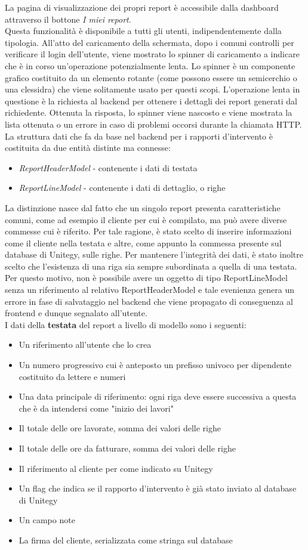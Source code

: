 La pagina di visualizzazione dei propri report è accessibile dalla dashboard attraverso il bottone \emph{I miei report}.
\\
Questa funzionalità è disponibile a tutti gli utenti, indipendentemente dalla tipologia.
All'atto del caricamento della schermata, dopo i comuni controlli per verificare il login dell'utente, viene mostrato lo spinner di caricamento a indicare che è in corso 
un'operazione potenzialmente lenta.
Lo spinner è un componente grafico costituito da un elemento rotante (come possono essere un semicerchio o una clessidra) che viene solitamente usato per questi scopi.
L'operazione lenta in questione è la richiesta al backend per ottenere i dettagli dei report generati dal richiedente.
Ottenuta la risposta, lo spinner viene nascosto e viene mostrata la lista ottenuta o un errore in caso di problemi occorsi durante la chiamata HTTP.
La struttura dati che fa da base nel backend per i rapporti d'intervento è costituita da due entità distinte ma connesse:
\begin{itemize}
    \item \emph{ReportHeaderModel} - contenente i dati di testata
    \item \emph{ReportLineModel} - contenente i dati di dettaglio, o righe
\end{itemize}
La distinzione nasce dal fatto che un singolo report presenta caratteristiche comuni, come ad esempio il cliente per cui è compilato, ma può avere diverse commesse cui è riferito.
Per tale ragione, è stato scelto di inserire informazioni come il cliente nella testata e altre, come appunto la commessa presente sul database di Unitegy, sulle righe.
Per mantenere l'integrità dei dati, è stato inoltre scelto che l'esistenza di una riga sia sempre subordinata a quella di una testata.
Per questo motivo, non è possibile avere un oggetto di tipo ReportLineModel senza un riferimento al relativo ReportHeaderModel e tale evenienza genera un errore in fase di salvataggio
nel backend che viene propagato di conseguenza al frontend e dunque segnalato all'utente.
\\
I dati della \textbf{testata} del report a livello di modello sono i seguenti:
\begin{itemize}
    \item Un riferimento all'utente che lo crea
    \item Un numero progressivo cui è anteposto un prefisso univoco per dipendente costituito da lettere e numeri
    \item Una data principale di riferimento: ogni riga deve essere successiva a questa che è da intendersi come "inizio dei lavori"
    \item Il totale delle ore lavorate, somma dei valori delle righe
    \item Il totale delle ore da fatturare, somma dei valori delle righe
    \item Il riferimento al cliente per come indicato su Unitegy
    \item Un flag che indica se il rapporto d'intervento è già stato inviato al database di Unitegy
    \item Un campo note
    \item La firma del cliente, serializzata come stringa sul database
\end{itemize}
